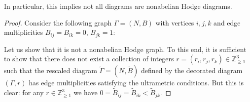 \documentclass[11pt,a4paper]{amsart}
\numberwithin{equation}{section}
\begin{document}
In particular, this implies not all diagrams are nonabelian Hodge diagrams. 

\begin{proof}Consider the following graph $\Gamma=(N,B)$ with vertices $i,j,k$ and edge multiplicities $B_{ij}=B_{ik}=0$, $B_{jk}=1$:
\begin{center}
\end{center}


Let us show that it is not a nonabelian Hodge graph. To this end, it is sufficient to show that there does not exist a collection of integers $r=(r_i, r_j, r_k)\in \mathbb Z_{\geq 1}^3$ such that the rescaled diagram $\widetilde{\Gamma}=(N,\widetilde B)$ defined by the decorated diagram $(\Gamma, r)$ has edge multiplicities satisfying the ultrametric conditions. But this is clear: for any $r\in \mathbb Z_{\geq 1}^3$ we have $0=\widetilde B_{ij}=\widetilde B_{ik}<\widetilde B_{jk}$.
\end{proof}
\end{document}
